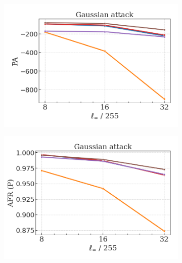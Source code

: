 \begin{figure}[H]
    \centering
    \begin{subfigure}[b]{0.3\textwidth}
        \centering
        \includegraphics[width=\textwidth]{img/results_discussion/adversarial/GAUSSIAN_logPA_eps.png}
    \end{subfigure}
    \hfill
    \begin{subfigure}[b]{0.3\textwidth}
        \centering
        \includegraphics[width=\textwidth]{img/results_discussion/adversarial/GAUSSIAN_AFR_pred_eps.png}
    \end{subfigure}
    \hfill
    \begin{subfigure}[b]{0.3\textwidth}
        \centering
        \vspace{-5pt}

\end{subfigure}
\end{figure}
